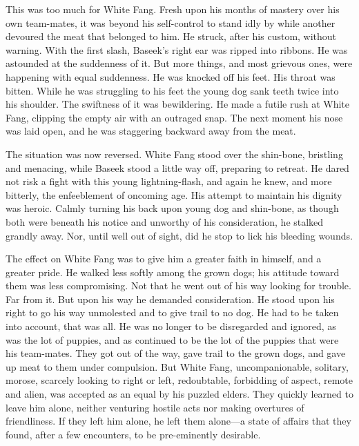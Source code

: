 \documentclass[10pt]{book}
\begin{document}
This was too much for White Fang. Fresh upon his months of mastery over
his own team-mates, it was beyond his self-control to stand idly by
while another devoured the meat that belonged to him. He struck, after
his custom, without warning. With the first slash, Baseek’s right ear
was ripped into ribbons. He was astounded at the suddenness of it. But
more things, and most grievous ones, were happening with equal
suddenness. He was knocked off his feet. His throat was bitten. While
he was struggling to his feet the young dog sank teeth twice into his
shoulder. The swiftness of it was bewildering. He made a futile rush at
White Fang, clipping the empty air with an outraged snap. The next
moment his nose was laid open, and he was staggering backward away from
the meat.

The situation was now reversed. White Fang stood over the shin-bone,
bristling and menacing, while Baseek stood a little way off, preparing
to retreat. He dared not risk a fight with this young lightning-flash,
and again he knew, and more bitterly, the enfeeblement of oncoming age.
His attempt to maintain his dignity was heroic. Calmly turning his back
upon young dog and shin-bone, as though both were beneath his notice
and unworthy of his consideration, he stalked grandly away. Nor, until
well out of sight, did he stop to lick his bleeding wounds.

The effect on White Fang was to give him a greater faith in himself,
and a greater pride. He walked less softly among the grown dogs; his
attitude toward them was less compromising. Not that he went out of his
way looking for trouble. Far from it. But upon his way he demanded
consideration. He stood upon his right to go his way unmolested and to
give trail to no dog. He had to be taken into account, that was all. He
was no longer to be disregarded and ignored, as was the lot of puppies,
and as continued to be the lot of the puppies that were his team-mates.
They got out of the way, gave trail to the grown dogs, and gave up meat
to them under compulsion. But White Fang, uncompanionable, solitary,
morose, scarcely looking to right or left, redoubtable, forbidding of
aspect, remote and alien, was accepted as an equal by his puzzled
elders. They quickly learned to leave him alone, neither venturing
hostile acts nor making overtures of friendliness. If they left him
alone, he left them alone—a state of affairs that they found, after a
few encounters, to be pre-eminently desirable.
\end{document}
